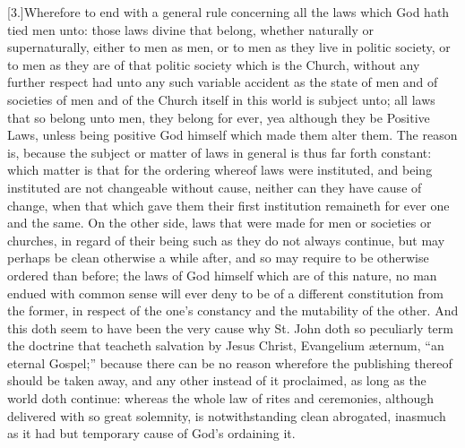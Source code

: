 [3.]Wherefore to end with a general rule concerning all the laws which God hath tied men unto: those laws divine that belong, whether naturally or supernaturally, either to men as men, or to men as they live in politic society, or to men as they are of that politic society which is the Church, without any further respect had unto any such variable accident as the state of men and of societies of men and of the Church itself in this world is subject unto; all laws that so belong unto men, they belong for ever, yea although they be Positive Laws, unless being positive God himself which made them alter them. The reason is, because the subject or matter of laws in general is thus far forth constant: which matter is that for the ordering whereof laws were instituted, and being instituted are not changeable without cause, neither can they have cause of change, when that which gave them their first institution remaineth for ever one and the same. On the other side, laws that were made for men or societies or churches, in regard of their being such as they do not always continue, but may perhaps be clean otherwise a while after, and so may require to be otherwise ordered than before; the laws of God himself which are of this nature, no man endued with common sense will ever deny to be of a different constitution from the former, in respect of the one’s  constancy and the mutability of the other. And this doth seem to have been the very cause why St. John doth so peculiarly term the doctrine that teacheth salvation by Jesus Christ, Evangelium æternum, “an eternal Gospel;” because there can be no reason wherefore the publishing thereof should be taken away, and any other instead of it proclaimed, as long as the world doth continue: whereas the whole law of rites and ceremonies, although delivered with so great solemnity, is notwithstanding clean abrogated, inasmuch as it had but temporary cause of God’s ordaining it.

